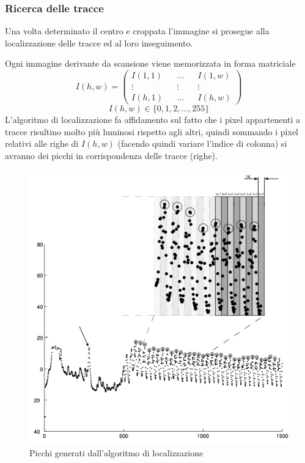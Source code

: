 \subsubsection{Ricerca delle tracce}
Una volta determinato il centro e croppata l'immagine si prosegue alla localizzazione delle tracce ed al loro inseguimento.

Ogni immagine derivante da scansione viene memorizzata in forma matriciale 
$$I(h,w) = \begin{pmatrix} 
	I(1,1) && \ldots && I(1,w) \\
	\vdots && \vdots && \vdots \\
	I(h,1) && \ldots && I(h,w)
\end{pmatrix}$$  $$I(h,w) \in \{0, 1,2,\ldots, 255\}$$
L'algoritmo di localizzazione fa affidamento sul fatto che i pixel appartenenti a tracce risultino molto pi\`u luminosi rispetto agli altri, quindi sommando i pixel relativi alle righe di $I(h,w)$ (facendo quindi variare l'indice di colonna) si avranno dei picchi in corrispondenza delle tracce (righe).
\begin{figure}[h!t]
\begin{center}
\includegraphics[scale=0.3]{./img/track-detection.png}
\caption{Picchi generati dall'algoritmo di localizzazione}
\end{center}
\end{figure}
